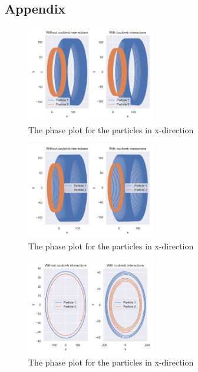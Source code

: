 \subsection*{Appendix }

\begin{figure}[H]
    \centering
    \includegraphics[width=0.5\textwidth]{data/phase_plots_two_particles_x.pdf}
    \caption{The phase plot for the particles in x-direction}
    \label{fig:phase_two_particles_x}
\end{figure}
\begin{figure}[H]
    \centering
    \includegraphics[width=0.5\textwidth]{data/phase_plots_two_particles_y.pdf}
    \caption{The phase plot for the particles in x-direction}
    \label{fig:phase_two_particles_y}
\end{figure}
\begin{figure}[H]
    \centering
    \includegraphics[width=0.5\textwidth]{data/phase_plots_two_particles_z.pdf}
    \caption{The phase plot for the particles in x-direction}
    \label{fig:phase_two_particles_z}
\end{figure}
